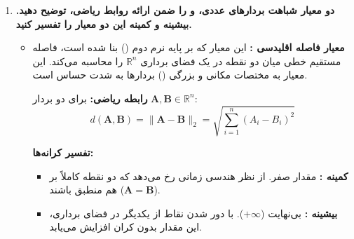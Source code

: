 \documentclass{article}
\begin{document}
\begin{enumerate}
    \textbf{نرم طیفی ():} 
    گاهی از نرم طیفی هم استفاده می‌شود:
    \[
    \|A-A_k\|_{2}=\sigma_{k+1}
    \]
    یعنی در این معیار، خطای بازسازی برابر با \textbf{اولین مقدار تکین حذف‌شده} است.

    \vspace{0.4cm}
    \textbf{تفسیر:}
    \vspace{0.2cm}
    \begin{itemize}
        \item اگر $k$ را بزرگ‌تر بگیریم، مقادیر تکین بیشتری نگه داشته می‌شود.
        \item در نتیجه، خطای بازسازی کوچک‌تر می‌شود.
        \item اگر همهٔ مقادیر تکین را نگه داریم، آنگاه $A_k=A$ و خطا صفر می‌شود.
    \end{itemize}

    \vspace{0.4cm}
    \textbf{مثال:}
    \vspace{0.2cm}
    
    فرض کنید مقادیر تکین یک ماتریس چنین باشد:
    \[
    \sigma_1=10,\qquad \sigma_2=7,\qquad \sigma_3=4,\qquad \sigma_4=2
    \]
    اگر فقط دو مقدار اول را نگه داریم ($k=2$)، خطای بازسازی فروبنیوس برابر است با:
    \[
    \|A-A_k\|_F = \sqrt{4^2+2^2} = \sqrt{16+4} = \sqrt{20}
    \]
    و خطای طیفی برابر است با:
    \[
    \|A-A_k\|_2=4
    \]

    \newpage
    \item \textbf{دو معیار شباهت بردارهای عددی،  و  را ضمن ارائه روابط ریاضی، توضیح دهید. بیشینه و کمینه این دو معیار را تفسیر کنید.}

    \vspace{0.3cm}
    \begin{itemize}
        \item \textbf{معیار فاصله اقلیدسی :}
        این معیار که بر پایه نرم دوم () بنا شده است، فاصله مستقیم خطی میان دو نقطه در یک فضای برداری $\mathbb{R}^n$ را محاسبه می‌کند. این معیار به مختصات مکانی و بزرگی () بردارها به شدت حساس است.
        
        \textbf{رابطه ریاضی:} برای دو بردار $\mathbf{A}, \mathbf{B} \in \mathbb{R}^n$:
        \[
        d(\mathbf{A}, \mathbf{B}) = \|\mathbf{A} - \mathbf{B}\|_2 = \sqrt{\sum_{i=1}^{n} (A_i - B_i)^2}
        \]
        
        \textbf{تفسیر کرانه‌ها:}
        \begin{itemize}
            \item \textbf{کمینه :} مقدار صفر. از نظر هندسی زمانی رخ می‌دهد که دو نقطه کاملاً بر هم منطبق باشند ($\mathbf{A} = \mathbf{B}$).
            \item \textbf{بیشینه :} بی‌نهایت ($+\infty$). با دور شدن نقاط از یکدیگر در فضای برداری، این مقدار بدون کران افزایش می‌یابد.
        \end{itemize}


\end{itemize}
\end{enumerate}
\end{document}
